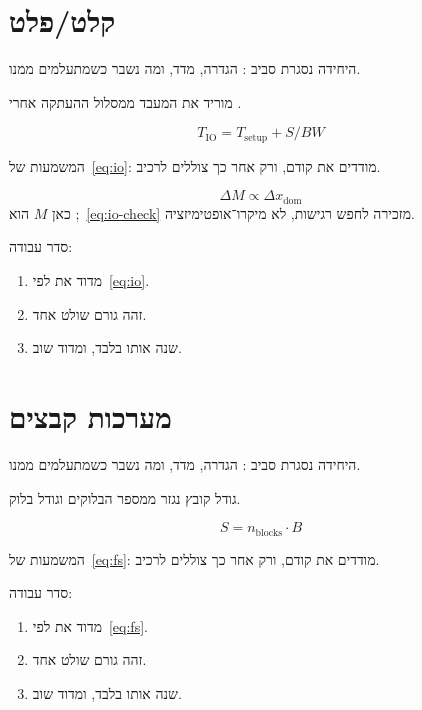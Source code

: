 \chapter{קלט/פלט}
\label{ch:io}

היחידה נסגרת סביב : הגדרה, מדד, ומה נשבר כשמתעלמים ממנו.

\begin{keybox}[frametitle={רעיון מפתח — קלט/פלט}]
 מוריד את המעבד ממסלול ההעתקה אחרי .
\end{keybox}

\begin{equation}
\label{eq:io}
T_{\mathrm{IO}}=T_{\mathrm{setup}}+S/BW
\end{equation}

המשמעות של~\eqref{eq:io}: מודדים את  קודם, ורק אחר כך צוללים לרכיב.

\begin{equation}
\label{eq:io-check}
\Delta M \propto \Delta x_{\mathrm{dom}}
\end{equation}
כאן $M$ הוא ;~\eqref{eq:io-check} מזכירה לחפש רגישות, לא מיקרו־אופטימיזציה.

סדר עבודה:
\begin{enumerate}
\item[(\textbf{א})] מדוד את  לפי~\eqref{eq:io}.
\item[(\textbf{ב})] זהה גורם שולט אחד.
\item[(\textbf{ג})] שנה אותו בלבד, ומדוד שוב.
\end{enumerate}

\chapter{מערכות קבצים}
\label{ch:fs}

היחידה נסגרת סביב : הגדרה, מדד, ומה נשבר כשמתעלמים ממנו.

\begin{defbox}[frametitle={הגדרה — מערכות קבצים}]
גודל קובץ נגזר ממספר הבלוקים וגודל בלוק.
\end{defbox}

\begin{equation}
\label{eq:fs}
S = n_{\mathrm{blocks}}\cdot B
\end{equation}

המשמעות של~\eqref{eq:fs}: מודדים את  קודם, ורק אחר כך צוללים לרכיב.

סדר עבודה:
\begin{enumerate}
\item[(\textbf{א})] מדוד את  לפי~\eqref{eq:fs}.
\item[(\textbf{ב})] זהה גורם שולט אחד.
\item[(\textbf{ג})] שנה אותו בלבד, ומדוד שוב.
\end{enumerate}

